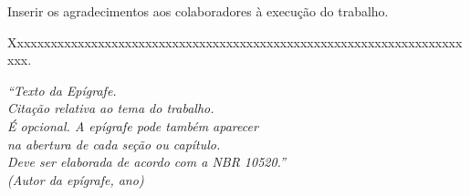 \begin{agradecimentos}
	Inserir os agradecimentos aos colaboradores à execução do trabalho. 
	
	Xxxxxxxxxxxxxxxxxxxxxxxxxxxxxxxxxxxxxxxxxxxxxxxxxxxxxxxxxxxxxxxxxxxxxx. 
\end{agradecimentos}

\begin{epigrafe}
	\vspace*{\fill}
	\begin{flushright}
		\textit{``Texto da Epígrafe.\\
			Citação relativa ao tema do trabalho.\\
			É opcional. A epígrafe pode também aparecer\\
			na abertura de cada seção ou capítulo.\\
			Deve ser elaborada de acordo com a NBR 10520.''\\
			(Autor da epígrafe, ano)}
	\end{flushright}
\end{epigrafe}


